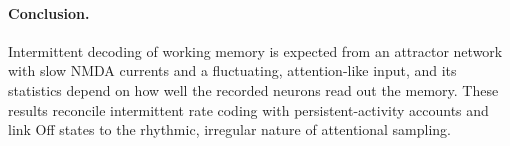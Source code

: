 \paragraph{Conclusion.}
Intermittent decoding of working memory is expected from an attractor network with slow NMDA currents and a fluctuating, attention-like input, and its statistics depend on how well the recorded neurons read out the memory.
These results reconcile intermittent rate coding with persistent-activity accounts and link Off states to the rhythmic, irregular nature of attentional sampling.
